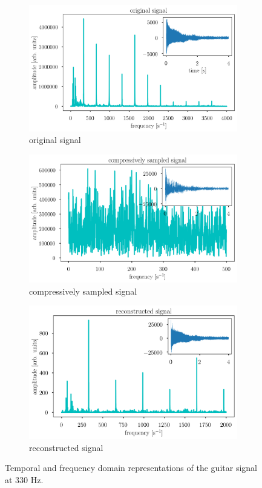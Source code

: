 \documentclass[10pt,a4paper,twoside]{article}
\begin{document}
\begin{figure}[!htb]
	\centering
	\begin{subfigure}{0.32\linewidth}
		\centering
		\includegraphics[width=\linewidth]{E1_original.png}
		\caption{original signal}
		\label{fig:record-orig}
	\end{subfigure}
	\begin{subfigure}{0.32\linewidth}
		\centering
		\includegraphics[width=\linewidth]{E1_comp.png}
		\caption{compressively sampled signal}
		\label{fig:record-comp}
	\end{subfigure}
	\begin{subfigure}{0.32\linewidth}
		\centering
		\includegraphics[width=\linewidth]{E1_recon_lasso.png}
		\caption{reconstructed signal}
		\label{fig:record-recon-lasso}
	\end{subfigure}
	\caption{Temporal and frequency domain representations of the guitar signal at 330 Hz.}
\end{figure}
\end{document}
